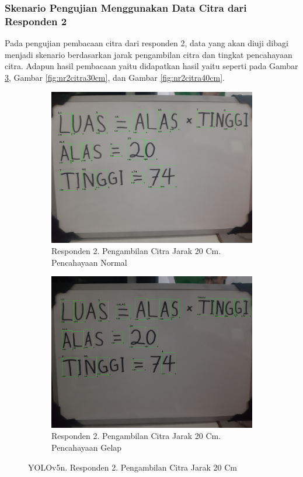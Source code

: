 \subsubsection{Skenario Pengujian Menggunakan Data Citra dari Responden 2}
\label{subsubsec:nskenarioresponden2}

Pada pengujian pembacaan citra dari responden 2, data yang akan diuji dibagi menjadi skenario berdasarkan jarak pengambilan citra dan tingkat pencahayaan citra. Adapun hasil pembacaan yaitu didapatkan hasil yaitu seperti pada Gambar \ref*{fig:nr2citra20cm}, Gambar \ref*{fig:nr2citra30cm}, dan Gambar \ref*{fig:nr2citra40cm}.

\begin{figure}[H]
  \begin{subfigure}{.5\textwidth}
    \centering
    \captionsetup{width=.8\linewidth}
    \includegraphics[width=.8\linewidth]{gambar/yolov5n/responden2/ghiyas20cm00-result.jpg}
    \caption{Responden 2. Pengambilan Citra Jarak 20 Cm. Pencahayaan Normal}
    \label{fig:nr2tcitra20cm}
  \end{subfigure}%
  \begin{subfigure}{.5\textwidth}
    \centering
    \captionsetup{width=.8\linewidth}
    \includegraphics[width=.8\linewidth]{gambar/yolov5n/responden2/ghiyas20cm10-result.jpg}
    \caption{Responden 2. Pengambilan Citra Jarak 20 Cm. Pencahayaan Gelap}
    \label{fig:nr2gcitra20cm}
  \end{subfigure}
  \caption{YOLOv5n. Responden 2. Pengambilan Citra Jarak 20 Cm}
  \label{fig:nr2citra20cm}
\end{figure}

